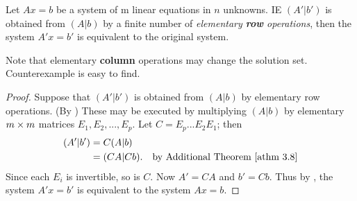 \begin{corollary} \label{corollary 3.13.1}
Let \(Ax = b\) be a system of m linear equations in \(n\) unknowns.
IE \((A'|b')\) is obtained from \((A | b)\) by a finite number of \emph{elementary \textbf{row} operations}, then the system \(A'x = b'\) is equivalent to the original system.
\end{corollary}

\begin{note}
Note that elementary \textbf{column} operations may change the solution set.
Counterexample is easy to find.
\end{note}

\begin{proof}
Suppose that \((A'|b')\) is obtained from \((A|b)\) by elementary row
operations.
(By ) These may be executed by multiplying \((A|b)\) by elementary \(m \times m\) matrices \(E_1, E_2, ..., E_p\).
Let \(C = E_p ... E_2 E_1\);
then
\begin{align*}
    (A' | b') & = C(A | b) \\
              & = (CA | Cb). & \text{by \ATHM{3.8}}
\end{align*}
Since each \(E_i\) is invertible, so is \(C\). Now \(A' = CA\) and \(b' = Cb\).
Thus by , the system \(A'x = b'\) is equivalent to the system \(Ax = b\).
\end{proof}

